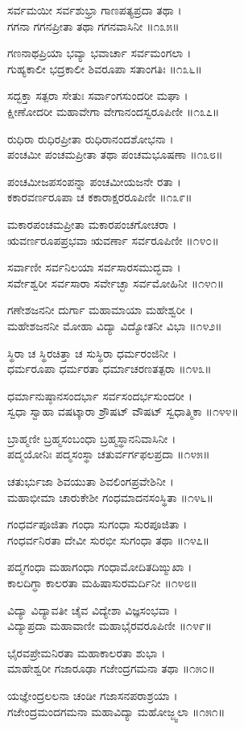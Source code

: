 ಸರ್ವಮಯೀ ಸರ್ವಶುಭ್ರಾ ಗಾಣಪತ್ಯಪ್ರದಾ ತಥಾ ।\\
ಗಗನಾ ಗಗನಪ್ರೀತಾ ತಥಾ ಗಗನವಾಸಿನೀ ॥೧೩೫॥

ಗಣನಾಥಪ್ರಿಯಾ ಭವ್ಯಾ ಭವಾರ್ಚಾ ಸರ್ವಮಂಗಲಾ ।\\
ಗುಹ್ಯಕಾಲೀ ಭದ್ರಕಾಲೀ ಶಿವರೂಪಾ ಸತಾಂಗತಿಃ ॥೧೩೬॥

ಸದ್ಭಕ್ತಾ ಸತ್ಪರಾ ಸೇತುಃ ಸರ್ವಾಂಗಸುಂದರೀ ಮಘಾ ।\\
ಕ್ಷೀಣೋದರೀ ಮಹಾವೇಗಾ ವೇಗಾನಂದಸ್ವರೂಪಿಣೀ ॥೧೩೭॥

ರುಧಿರಾ ರುಧಿರಪ್ರೀತಾ ರುಧಿರಾನಂದಶೋಭನಾ ।\\
ಪಂಚಮೀ ಪಂಚಮಪ್ರೀತಾ ತಥಾ ಪಂಚಮಭೂಷಣಾ ॥೧೩೮॥

ಪಂಚಮೀಜಪಸಂಪನ್ನಾ ಪಂಚಮೀಯಜನೇ ರತಾ ।\\
ಕಕಾರವರ್ಣರೂಪಾ ಚ ಕಕಾರಾಕ್ಷರರೂಪಿಣೀ ॥೧೩೯॥

ಮಕಾರಪಂಚಮಪ್ರೀತಾ ಮಕಾರಪಂಚಗೋಚರಾ ।\\
ಋವರ್ಣರೂಪಪ್ರಭವಾ ಋವರ್ಣಾ ಸರ್ವರೂಪಿಣೀ ॥೧೪೦॥

ಸರ್ವಾಣೀ ಸರ್ವನಿಲಯಾ ಸರ್ವಸಾರಸಮುದ್ಭವಾ ।\\
ಸರ್ವೇಶ್ವರೀ ಸರ್ವಸಾರಾ ಸರ್ವೇಚ್ಛಾ ಸರ್ವಮೋಹಿನೀ ॥೧೪೧॥

ಗಣೇಶಜನನೀ ದುರ್ಗಾ ಮಹಾಮಾಯಾ ಮಹೇಶ್ವರೀ ।\\
ಮಹೇಶಜನನೀ ಮೋಹಾ ವಿದ್ಯಾ ವಿದ್ಯೋತನೀ ವಿಭಾ ॥೧೪೨॥

ಸ್ಥಿರಾ ಚ ಸ್ಥಿರಚಿತ್ತಾ ಚ ಸುಸ್ಥಿರಾ ಧರ್ಮರಂಜಿನೀ ।\\
ಧರ್ಮರೂಪಾ ಧರ್ಮರತಾ ಧರ್ಮಾಚರಣತತ್ಪರಾ ॥೧೪೩॥

ಧರ್ಮಾನುಷ್ಠಾನಸಂದರ್ಭಾ ಸರ್ವಸಂದರ್ಭಸುಂದರೀ ।\\
ಸ್ವಧಾ ಸ್ವಾಹಾ ವಷಟ್ಕಾರಾ ಶ್ರೌಷಟ್ ವೌಷಟ್ ಸ್ವಧಾತ್ಮಿಕಾ ॥೧೪೪॥

ಬ್ರಾಹ್ಮಣೀ ಬ್ರಹ್ಮಸಂಬಂಧಾ ಬ್ರಹ್ಮಸ್ಥಾನನಿವಾಸಿನೀ ।\\
ಪದ್ಮಯೋನಿಃ ಪದ್ಮಸಂಸ್ಥಾ ಚತುರ್ವರ್ಗಫಲಪ್ರದಾ ॥೧೪೫॥

ಚತುರ್ಭುಜಾ ಶಿವಯುತಾ ಶಿವಲಿಂಗಪ್ರವೇಶಿನೀ ।\\
ಮಹಾಭೀಮಾ ಚಾರುಕೇಶೀ ಗಂಧಮಾದನಸಂಸ್ಥಿತಾ ॥೧೪೬॥

ಗಂಧರ್ವಪೂಜಿತಾ ಗಂಧಾ ಸುಗಂಧಾ ಸುರಪೂಜಿತಾ ।\\
ಗಂಧರ್ವನಿರತಾ ದೇವೀ ಸುರಭೀ ಸುಗಂಧಾ ತಥಾ ॥೧೪೭॥

ಪದ್ಮಗಂಧಾ ಮಹಾಗಂಧಾ ಗಂಧಾಮೋದಿತದಿಙ್ಮುಖಾ ।\\
ಕಾಲದಿಗ್ಧಾ ಕಾಲರತಾ ಮಹಿಷಾಸುರಮರ್ದಿನೀ ॥೧೪೮॥

ವಿದ್ಯಾ ವಿದ್ಯಾವತೀ ಚೈವ ವಿದ್ಯೇಶಾ ವಿಜ್ಞಸಂಭವಾ ।\\
ವಿದ್ಯಾಪ್ರದಾ ಮಹಾವಾಣೀ ಮಹಾಭೈರವರೂಪಿಣೀ ॥೧೪೯॥

ಭೈರವಪ್ರೇಮನಿರತಾ ಮಹಾಕಾಲರತಾ ಶುಭಾ ।\\
ಮಾಹೇಶ್ವರೀ ಗಜಾರೂಢಾ ಗಜೇಂದ್ರಗಮನಾ ತಥಾ ॥೧೫೦॥

ಯಜ್ಞೇಂದ್ರಲಲನಾ ಚಂಡೀ ಗಜಾಸನಪರಾಶ್ರಯಾ ।\\
ಗಜೇಂದ್ರಮಂದಗಮನಾ ಮಹಾವಿದ್ಯಾ ಮಹೋಜ್ಜ್ವಲಾ ॥೧೫೧॥

